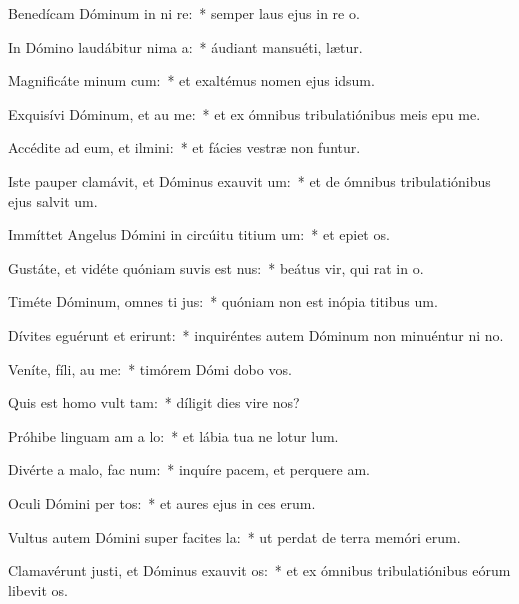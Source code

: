 \item Benedícam Dóminum in ni re:~* semper laus ejus in re o.
\item In Dómino laudábitur nima a:~* áudiant mansuéti,  lætur.
\item Magnificáte minum cum:~* et exaltémus nomen ejus  idsum.
\item Exquisívi Dóminum, et au me:~* et ex ómnibus tribulatiónibus meis epu me.
\item Accédite ad eum, et ilmini:~* et fácies vestræ non funtur.
\item Iste pauper clamávit, et Dóminus exauvit um:~* et de ómnibus tribulatiónibus ejus salvit um.
\item Immíttet Angelus Dómini in circúitu titium um:~* et epiet os.
\item Gustáte, et vidéte quóniam suvis est nus:~* beátus vir, qui rat in o.
\item Timéte Dóminum, omnes ti jus:~* quóniam non est inópia titibus um.
\item Dívites eguérunt et erirunt:~* inquiréntes autem Dóminum non minuéntur ni no.
\item Veníte, fíli, au me:~* timórem Dómi dobo vos.
\item Quis est homo  vult tam:~* díligit dies vire nos?
\item Próhibe linguam am a lo:~* et lábia tua ne lotur lum.
\item Divérte a malo,  fac num:~* inquíre pacem, et perquere am.
\item Oculi Dómini per tos:~* et aures ejus in ces erum.
\item Vultus autem Dómini super facites la:~* ut perdat de terra memóri erum.
\item Clamavérunt justi, et Dóminus exauvit os:~* et ex ómnibus tribulatiónibus eórum libevit os.
